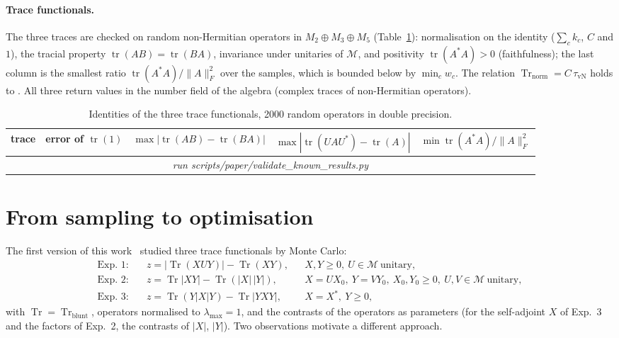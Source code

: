 \documentclass[11pt]{article}
\DeclareMathOperator{\Tr}{Tr}
\newcommand{\M}{\mathcal{M}}
\providecommand{\ValTraceRows}{\multicolumn{5}{c}{\emph{run scripts/paper/validate\_known\_results.py}}\\}
\begin{document}
\paragraph{Trace functionals.} The three traces are checked on random non-Hermitian operators in
$M_2\oplus M_3\oplus M_5$ (Table~\ref{tab:traces}): normalisation on the identity ($\sum_ck_c$, $C$ and $1$),
the tracial property $\operatorname{tr}(AB)=\operatorname{tr}(BA)$, invariance under unitaries of $\M$, and
positivity $\operatorname{tr}(A^*A)>0$ (faithfulness); the last column is the smallest ratio
$\operatorname{tr}(A^*A)/\|A\|_F^2$ over the samples, which is bounded below by $\min_cw_c$. The relation $\Tr_{\mathrm{norm}}=C\,\tau_{\mathrm{vN}}$ holds to
. All three return values
in the number field of the algebra (complex traces of non-Hermitian operators).

\begin{table}[h]
\centering\small
\begin{tabular}{lcccc}
\toprule
trace & error of $\operatorname{tr}(1)$ & $\max|\operatorname{tr}(AB)-\operatorname{tr}(BA)|$ &
$\max|\operatorname{tr}(UAU^*)-\operatorname{tr}(A)|$ & $\min\operatorname{tr}(A^*A)/\|A\|_F^2$\\
\midrule
\ValTraceRows
\bottomrule
\end{tabular}
\caption{Identities of the three trace functionals, 2000 random operators in double precision.}
\label{tab:traces}
\end{table}

\section{From sampling to optimisation}\label{sec:optimisation}

The first version of this work~\cite{v1} studied three trace functionals by Monte Carlo:
\begin{align*}
  \text{Exp.~1:}\quad & z=|\Tr(XUY)|-\Tr(XY), && X,Y\ge0,\ U\in\M\ \text{unitary},\\
  \text{Exp.~2:}\quad & z=\Tr|XY|-\Tr(|X|\,|Y|), && X=UX_0,\ Y=VY_0,\ X_0,Y_0\ge0,\ U,V\in\M\ \text{unitary},\\
  \text{Exp.~3:}\quad & z=\Tr(Y|X|Y)-\Tr|YXY|, && X=X^*,\ Y\ge0,
\end{align*}
with $\Tr=\Tr_{\mathrm{blunt}}$, operators normalised to $\lambda_{\max}=1$, and the contrasts of the
operators as parameters (for the self-adjoint $X$ of Exp.~3 and the factors of Exp.~2, the contrasts of $|X|$, $|Y|$). Two observations motivate a different approach.
\end{document}
